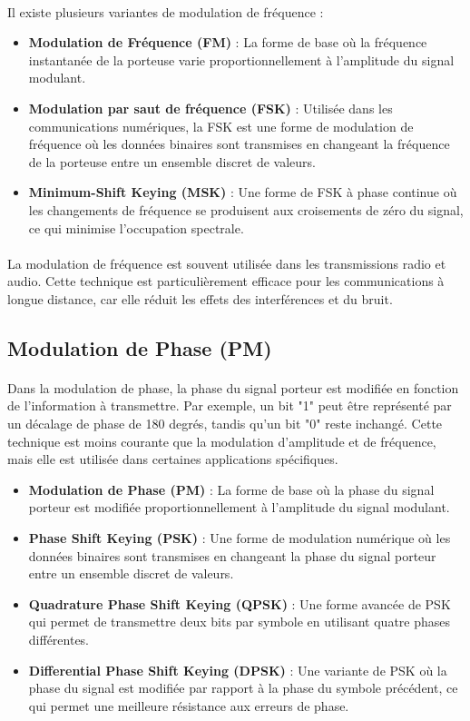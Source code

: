 \documentclass[a4paper,twocolumn]{report}
\begin{document}
\paragraph{}Il existe plusieurs variantes de modulation de fréquence :
\begin{itemize}
	\item \textbf{Modulation de Fréquence (FM)} :
    La forme de base où la fréquence instantanée de la porteuse varie proportionnellement
    à l'amplitude du signal modulant.
	\item \textbf{Modulation par saut de fréquence (FSK)} :
    Utilisée dans les communications numériques, la FSK est une forme de modulation
    de fréquence où les données binaires sont transmises en changeant
    la fréquence de la porteuse entre un ensemble discret de valeurs.
	\item \textbf{Minimum-Shift Keying (MSK)} :
    Une forme de FSK à phase continue où les changements de fréquence se produisent
    aux croisements de zéro du signal, ce qui minimise l'occupation spectrale.
\end{itemize}
\paragraph{}La modulation de fréquence est souvent utilisée dans les transmissions
radio et audio. Cette technique est particulièrement efficace pour les communications à longue distance,
car elle réduit les effets des interférences et du bruit.

\subsection{Modulation de Phase (PM)}
\paragraph{}Dans la modulation de phase, la phase du signal porteur est modifiée
en fonction de l'information à transmettre.
Par exemple, un bit "1" peut être représenté par un décalage de phase de 180 degrés,
tandis qu'un bit "0" reste inchangé. Cette technique est moins courante que la modulation d'amplitude et de fréquence,
mais elle est utilisée dans certaines applications spécifiques.
\begin{itemize}
	\item \textbf{Modulation de Phase (PM)} :
    La forme de base où la phase du signal porteur est modifiée proportionnellement à l'amplitude du signal modulant.
	\item \textbf{Phase Shift Keying (PSK)} :
    Une forme de modulation numérique où les données binaires sont transmises en
    changeant la phase du signal porteur entre un ensemble discret de valeurs.
	\item \textbf{Quadrature Phase Shift Keying (QPSK)} :
    Une forme avancée de PSK qui permet de transmettre deux bits par symbole en utilisant quatre phases différentes.
	\item \textbf{Differential Phase Shift Keying (DPSK)} :
    Une variante de PSK où la phase du signal est modifiée par rapport à la phase du symbole précédent,
    ce qui permet une meilleure résistance aux erreurs de phase.
\end{itemize}
\end{document}
